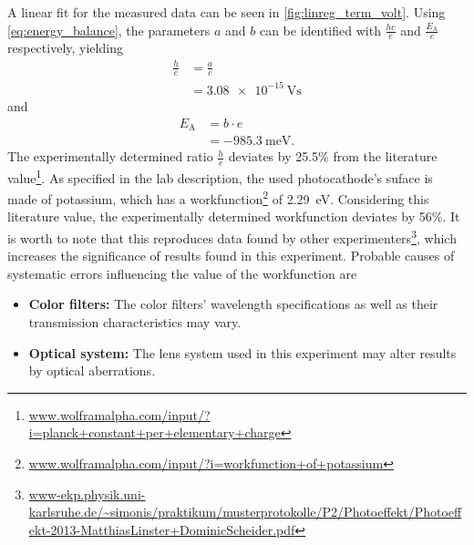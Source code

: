 A linear fit for the measured data can be seen in \autoref{fig:linreg_term_volt}.
Using \autoref{eq:energy_balance}, the parameters $a$ and $b$ can be identified with $\frac{hc}{e}$ and $\frac{E_\text{A}}{e}$ respectively, yielding
\begin{align*}
	\frac{h}{e} &= \frac{a}{c} \\
	&=\SI{3.08e-15}{\volt\second}
\end{align*}
and
\begin{align*}
	E_\text{A} &= b\cdot e \\
	&=\SI{-985.3}{\milli\eV}.
\end{align*}
The experimentally determined ratio $\frac{h}{e}$ deviates by \num{25.5}\% from the literature value\footnote{\url{www.wolframalpha.com/input/?i=planck+constant+per+elementary+charge}}.
As specified in the lab description, the used photocathode's suface is made of potassium, which has a workfunction\footnote{\url{www.wolframalpha.com/input/?i=workfunction+of+potassium}} of \SI{2.29}{\eV}.
Considering this literature value, the experimentally determined workfunction deviates by \num{56}\%.
It is worth to note that this reproduces data found by other experimenters\footnote{\url{www-ekp.physik.uni-karlsruhe.de/~simonis/praktikum/musterprotokolle/P2/Photoeffekt/Photoeffekt-2013-MatthiasLinster+DominicScheider.pdf}}, which increases the significance of results found in this experiment.
Probable causes of systematic errors influencing the value of the workfunction are
\begin{itemize}
	\item \textbf{Color filters:} The color filters' wavelength specifications as well as their transmission characteristics may vary.
	\item \textbf{Optical system:} The lens system used in this experiment may alter results by optical aberrations.
\end{itemize}

